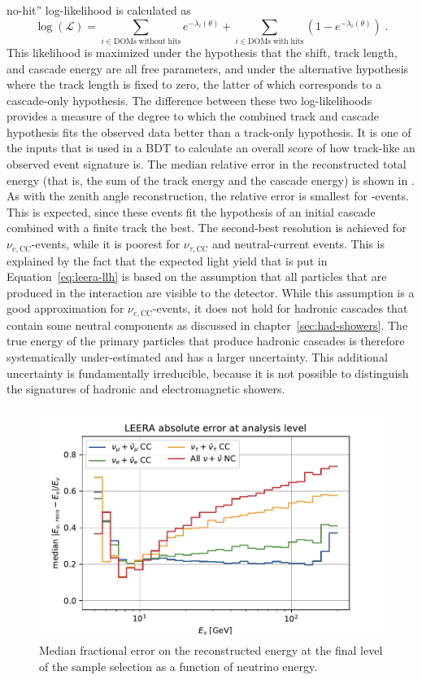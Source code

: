 no-hit'' log-likelihood is calculated as
\begin{equation}
    \log(\mathcal{L}) = \sum_{i\in\mathrm{DOMs\;without\;hits}} e^{-\lambda_i(\theta)} + \sum_{i\in\mathrm{DOMs\;with\;hits}} (1 - e^{-\lambda_i(\theta)})\;.
    \label{eq:leera-llh}
\end{equation}
This likelihood is maximized under the hypothesis that the shift, track length, and cascade energy are all free parameters, and under the alternative hypothesis where the track length is fixed to zero, the latter of which corresponds to a cascade-only hypothesis. The difference between these two log-likelihoods provides a measure of the degree to which the combined track and cascade hypothesis fits the observed data better than a track-only hypothesis. It is one of the inputs that is used in a BDT to calculate an overall score of how track-like an observed event signature is. The median relative error in the reconstructed total energy (that is, the sum of the track energy and the cascade energy) is shown in . As with the zenith angle reconstruction, the relative error is smallest for \numucc-events. This is expected, since these events fit the hypothesis of an initial cascade combined with a finite track the best. The second-best resolution is achieved for $\nu_{e,\mathrm{CC}}$-events, while it is poorest for $\nu_{\tau,\mathrm{CC}}$ and neutral-current events. This is explained by the fact that the expected light yield that is put in Equation~\ref{eq:leera-llh} is based on the assumption that all particles that are produced in the interaction are visible to the detector. While this assumption is a good approximation for $\nu_{e,\mathrm{CC}}$-events, it does not hold for hadronic cascades that contain some neutral components as discussed in chapter~\ref{sec:had-showers}.
The true energy of the primary particles that produce hadronic cascades is therefore systematically under-estimated and has a larger uncertainty.
This additional uncertainty is fundamentally irreducible, because it is not possible to distinguish the signatures of hadronic and electromagnetic showers.

\begin{figure}
    \centering
    \includegraphics[width=0.8\linewidth]{figures/icecube/reconstruction/leera/leera_absolute_error_final.pdf}
    \caption{Median fractional error on the reconstructed energy at the final level of the sample selection as a function of neutrino energy.}
    \label{fig:leera-resolution}
\end{figure}


